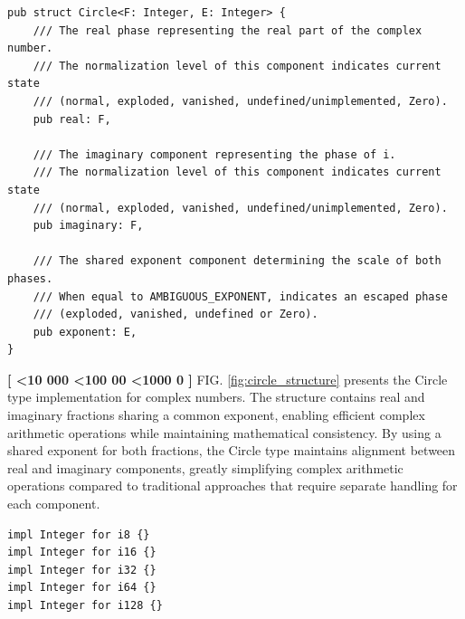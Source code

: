 \documentclass[12pt,letter]{article}
\newcounter{paracounter}
\newcommand{\ppara}[1]{
\noindent\textbf{[\formatparanumber{\arabic{paracounter}}]} \begingroup\RaggedRight\sloppy\hbadness=10000 #1\par\endgroup%
\stepcounter{paracounter}%
}
\newcommand{\formatparanumber}[1]{%
\ifnum#1<10 000%
\else\ifnum#1<100 00%
\else\ifnum#1<1000 0%
\fi\fi\fi#1%
}
\begin{document}
\newpage
\begin{lstlisting}[style=rust, caption={Circle Type Definition}, label={fig:circle_structure}]
pub struct Circle<F: Integer, E: Integer> {
	/// The real phase representing the real part of the complex number.
	/// The normalization level of this component indicates current state
	/// (normal, exploded, vanished, undefined/unimplemented, Zero).
	pub real: F,

	/// The imaginary component representing the phase of i.
	/// The normalization level of this component indicates current state
	/// (normal, exploded, vanished, undefined/unimplemented, Zero).
	pub imaginary: F,

	/// The shared exponent component determining the scale of both phases.
	/// When equal to AMBIGUOUS_EXPONENT, indicates an escaped phase
	/// (exploded, vanished, undefined or Zero).
	pub exponent: E,
}
\end{lstlisting}

\ppara{FIG. \ref{fig:circle_structure} presents the Circle type implementation for complex numbers. The structure contains real and imaginary fractions sharing a common exponent, enabling efficient complex arithmetic operations while maintaining mathematical consistency. By using a shared exponent for both fractions, the Circle type maintains alignment between real and imaginary components, greatly simplifying complex arithmetic operations compared to traditional approaches that require separate handling for each component.}
\vfill
\begin{lstlisting}[style=rust, caption={Where fraction: F and exponent: E are any sized integer}, label={fig:integer}]
impl Integer for i8 {}
impl Integer for i16 {}
impl Integer for i32 {}
impl Integer for i64 {}
impl Integer for i128 {}
\end{lstlisting}
\end{document}
